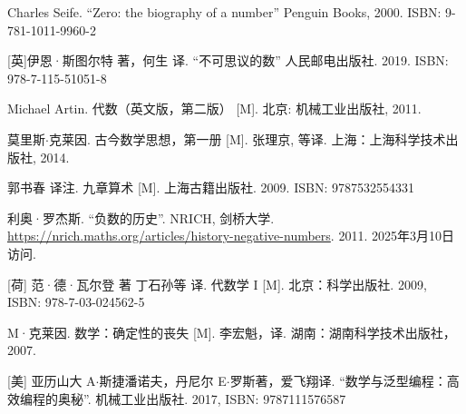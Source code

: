 Charles Seife. ``Zero: the biography of a number'' Penguin Books, 2000. ISBN: 9-781-1011-9960-2

[英]伊恩·斯图尔特 著，何生 译. ``不可思议的数'' 人民邮电出版社. 2019. ISBN: 978-7-115-51051-8

Michael Artin. 代数（英文版，第二版） [M]. 北京: 机械工业出版社, 2011. %

莫里斯$\cdot$克莱因. 古今数学思想，第一册 [M]. 张理京, 等译. 上海：上海科学技术出版社, 2014. %

郭书春 译注. 九章算术 [M]. 上海古籍出版社. 2009. ISBN: 9787532554331

利奥·罗杰斯. ``负数的历史''. NRICH, 剑桥大学. \url{https://nrich.maths.org/articles/history-negative-numbers}. 2011. 2025年3月10日访问.


[荷] 范·德·瓦尔登 著 丁石孙等 译. 代数学 I [M]. 北京：科学出版社. 2009, ISBN: 978-7-03-024562-5

M·克莱因. 数学：确定性的丧失 [M]. 李宏魁，译. 湖南：湖南科学技术出版社，2007. %

[美] 亚历山大 A$\cdot$斯捷潘诺夫，丹尼尔 E$\cdot$罗斯著，爱飞翔译. ``数学与泛型编程：高效编程的奥秘''. 机械工业出版社. 2017, ISBN: 9787111576587
